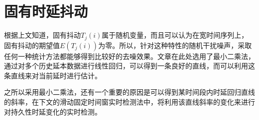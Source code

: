 \section{固有时延抖动}
根据上文知道，固有抖动$T_{j}(i)$属于随机变量，而且可以认为在宽时间序列上，固有抖动的期望值$E(T_{j}(i))$为零。所以，针对这种特性的随机干扰噪声，采取任何一种统计方法都能够得到比较好的去噪效果。文章在此处选用了最小二乘法，通过对多个历史延本数据进行线性回归，可以得到一条良好的直线，而可以利用这条直线来对当前延时进行估计。

之所以采用最小二乘法，还有一个重要的原因是可以得到某时间段内时延回归直线的斜率，在下文的滑动固定时间窗实时检测法中，将利用该直线斜率的变化来进行对持久性时延变化的实时检测。






